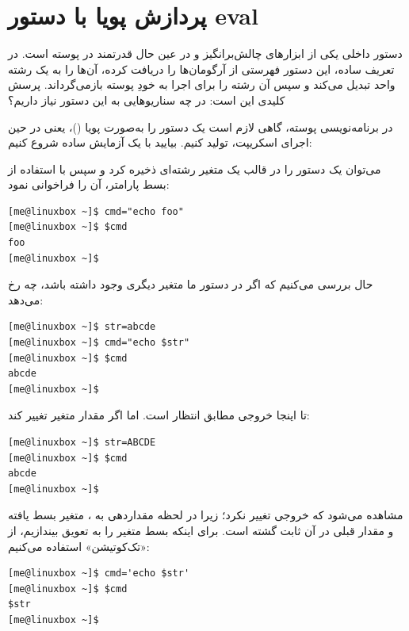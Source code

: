 \section{پردازش پویا با دستور eval}

دستور داخلی  یکی از ابزارهای چالش‌برانگیز و در عین حال قدرتمند در پوسته  است. در تعریف ساده، این دستور فهرستی از آرگومان‌ها را دریافت کرده، آن‌ها را به یک رشته واحد تبدیل می‌کند و سپس آن رشته را برای اجرا به خودِ پوسته بازمی‌گرداند. پرسش کلیدی این است: در چه سناریوهایی به این دستور نیاز داریم؟

در برنامه‌نویسی پوسته، گاهی لازم است یک دستور را به‌صورت پویا ()، یعنی در حین اجرای اسکریپت، تولید کنیم. بیایید با یک آزمایش ساده شروع کنیم:

می‌توان یک دستور را در قالب یک متغیر رشته‌ای ذخیره کرد و سپس با استفاده از بسط پارامتر، آن را فراخوانی نمود:

\begin{latin}
\begin{lstlisting}
[me@linuxbox ~]$ cmd="echo foo"
[me@linuxbox ~]$ $cmd
foo
[me@linuxbox ~]$
\end{lstlisting}
\end{latin}

حال بررسی می‌کنیم که اگر در دستور ما متغیر دیگری وجود داشته باشد، چه رخ می‌دهد:

\begin{latin}
\begin{lstlisting}
[me@linuxbox ~]$ str=abcde
[me@linuxbox ~]$ cmd="echo $str"
[me@linuxbox ~]$ $cmd
abcde
[me@linuxbox ~]$
\end{lstlisting}
\end{latin}

تا اینجا خروجی مطابق انتظار است. اما اگر مقدار متغیر  تغییر کند:

\begin{latin}
\begin{lstlisting}
[me@linuxbox ~]$ str=ABCDE
[me@linuxbox ~]$ $cmd
abcde
[me@linuxbox ~]$
\end{lstlisting}
\end{latin}

مشاهده می‌شود که خروجی تغییر نکرد؛ زیرا در لحظه مقداردهی به ، متغیر  بسط یافته و مقدار قبلی در آن ثابت گشته است. برای اینکه بسط متغیر را به تعویق بیندازیم، از «تک‌کوتیشن» استفاده می‌کنیم:

\begin{latin}
\begin{lstlisting}
[me@linuxbox ~]$ cmd='echo $str'
[me@linuxbox ~]$ $cmd
$str
[me@linuxbox ~]$
\end{lstlisting}
\end{latin}

